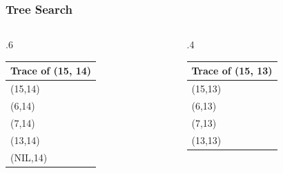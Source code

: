 \documentclass[10pt]{beamer}
\begin{document}
\begin{frame}[t]\frametitle{Tree Search}
	\begin{columns}[T] %
	\begin{column}{.6\linewidth} %
	
		{\footnotesize
				
		} %

		\vspace{1cm}
		{\footnotesize 
			\begin{tabular}{| l |}
			\hline
			Trace of {\scriptsize \TreeSearch(15, 14)}\\
			\hline
			\TreeSearch(15,14)\\
			\TreeSearch(6,14)\\
			\TreeSearch(7,14)\\
			\TreeSearch(13,14)\\
			\TreeSearch(NIL,14)\\
			\hline
			\end{tabular}
		} %

	\end{column} %
	\begin{column}{.4\linewidth} %

		{\small 
		
		} %

		{\footnotesize 
			\begin{tabular}{| l |}
			\hline
			Trace of {\scriptsize \TreeSearch(15, 13)}\\
			\hline
			\TreeSearch(15,13)\\
			\TreeSearch(6,13)\\
			\TreeSearch(7,13)\\
			\TreeSearch(13,13)\\
			\hline
			\end{tabular}
		} %

	\end{column} %
	\end{columns} %
	
\end{frame}
\end{document}
